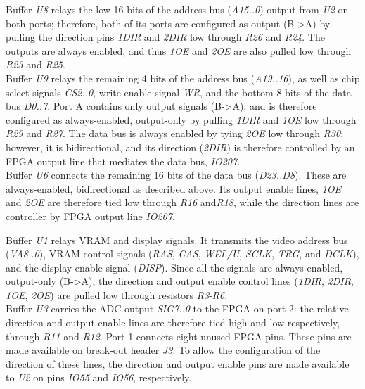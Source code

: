 \documentclass[titlepage]{scrartcl}
\begin{document}
	Buffer \textit{U8} relays the low 16 bits of the address bus (\textit{A15..0}) output from \textit{U2} on both ports; therefore, both of its ports are configured as output (B->A) by pulling the direction pins \textit{1DIR} and \textit{2DIR} low through \textit{R26} and \textit{R24}. The outputs are always enabled, and thus \textit{1OE} and \textit{2OE} are also pulled low through \textit{R23} and \textit{R25}.\\

	Buffer \textit{U9} relays the remaining 4 bits of the address bus (\textit{A19..16}), as well as chip select signals \textit{CS2..0}, write enable signal \textit{WR}, and the bottom 8 bits of the data bus \textit{D0..7}. Port A contains only output signals (B->A), and is therefore configured as always-enabled, output-only by pulling \textit{1DIR} and \textit{1OE} low through \textit{R29} and \textit{R27}. The data bus is always enabled by tying \textit{2OE} low through \textit{R30}; however, it is bidirectional, and its direction (\textit{2DIR}) is therefore controlled by an FPGA output line that mediates the data bus, \textit{IO207}.\\

	Buffer \textit{U6} connects the remaining 16 bits of the data bus (\textit{D23..D8}). These are always-enabled, bidirectional as described above. Its output enable lines, \textit{1OE} and \textit{2OE} are therefore tied low through \textit{R16} and\textit{R18}, while the direction lines are controller by FPGA output line \textit{IO207}.

	Buffer \textit{U1} relays VRAM and display signals. It transmits the video address bus (\textit{VA8..0}), VRAM control signals (\textit{RAS}, \textit{CAS}, \textit{WEL/U}, \textit{SCLK}, \textit{TRG}, and \textit{DCLK}), and the display enable signal (\textit{DISP}). Since all the signals are always-enabled, output-only (B->A), the direction and output enable control lines (\textit{1DIR}, \textit{2DIR}, \textit{1OE}, \textit{2OE}) are pulled low through resistors \textit{R3}-\textit{R6}.\\

	Buffer \textit{U3} carries the ADC output \textit{SIG7..0} to the FPGA on port 2: the relative direction and output enable lines are therefore tied high and low respectively, through \textit{R11} and \textit{R12}. Port 1 connects eight unused FPGA pins. These pins are made available on break-out header \textit{J3}. To allow the configuration of the direction of these lines, the direction and output enable pins are made available to \textit{U2} on pins \textit{IO55} and \textit{IO56}, respectively.\\
\end{document}
